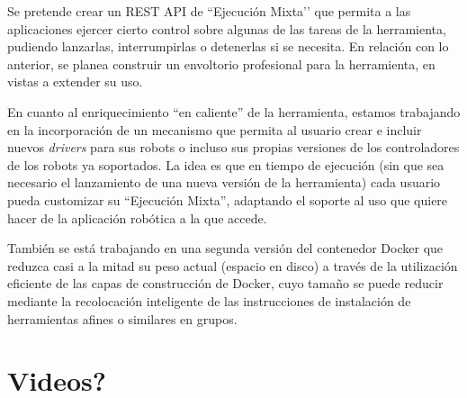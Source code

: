 Se pretende crear un REST API de ``Ejecución Mixta’’ que permita a las aplicaciones ejercer cierto control sobre algunas de las tareas de la herramienta, pudiendo lanzarlas, interrumpirlas o detenerlas si se necesita.
En relación con lo anterior, se planea construir un envoltorio profesional para la herramienta, en vistas a extender su uso.

En cuanto al enriquecimiento ``en caliente'' de la herramienta, estamos trabajando en la incorporación de un mecanismo que permita al usuario crear e incluir nuevos \textit{drivers} para sus robots o incluso sus propias versiones de los controladores de los robots ya soportados. La idea es que en tiempo de ejecución (sin que sea necesario el lanzamiento de una nueva versión de la herramienta) cada usuario pueda customizar su ``Ejecución Mixta'', adaptando el soporte al uso que quiere hacer de la aplicación robótica a la que accede.

También se está trabajando en una segunda versión del contenedor Docker que reduzca casi a la mitad su peso actual (espacio en disco) a través de la utilización eficiente de las capas de construcción de Docker, cuyo tamaño se puede reducir mediante la recolocación inteligente de las instrucciones de instalación de herramientas afines o similares en grupos.

\section{Videos?}
